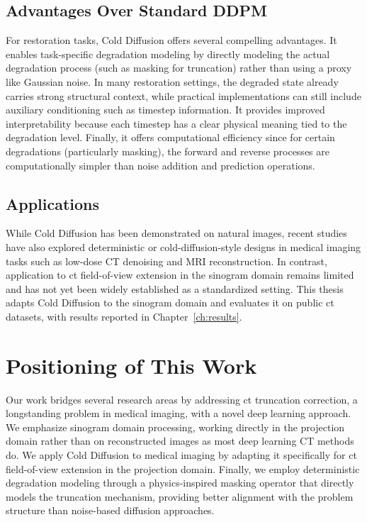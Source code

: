 \subsection{Advantages Over Standard DDPM}

For restoration tasks, Cold Diffusion offers several compelling advantages. It enables task-specific degradation modeling by directly modeling the actual degradation process (such as masking for truncation) rather than using a proxy like Gaussian noise. In many restoration settings, the degraded state already carries strong structural context, while practical implementations can still include auxiliary conditioning such as timestep information. It provides improved interpretability because each timestep has a clear physical meaning tied to the degradation level. Finally, it offers computational efficiency since for certain degradations (particularly masking), the forward and reverse processes are computationally simpler than noise addition and prediction operations.

\subsection{Applications}

While Cold Diffusion has been demonstrated on natural images, recent studies have also explored deterministic or cold-diffusion-style designs in medical imaging tasks such as low-dose CT denoising and MRI reconstruction. In contrast, application to \gls{ct} field-of-view extension in the sinogram domain remains limited and has not yet been widely established as a standardized setting. This thesis adapts Cold Diffusion to the sinogram domain and evaluates it on public \gls{ct} datasets, with results reported in Chapter~\ref{ch:results}.

\section{Positioning of This Work}

Our work bridges several research areas by addressing \gls{ct} truncation correction, a longstanding problem in medical imaging, with a novel deep learning approach. We emphasize sinogram domain processing, working directly in the projection domain rather than on reconstructed images as most deep learning CT methods do. We apply Cold Diffusion to medical imaging by adapting it specifically for \gls{ct} field-of-view extension in the projection domain. Finally, we employ deterministic degradation modeling through a physics-inspired masking operator that directly models the truncation mechanism, providing better alignment with the problem structure than noise-based diffusion approaches.

